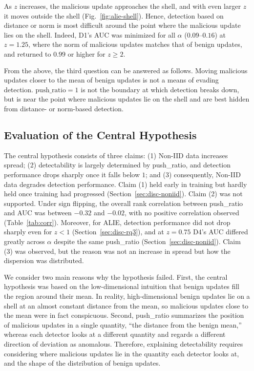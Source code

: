 \documentclass[a4paper,10pt]{article}
\newcommand{\PushRatio}{\textrm{push\_ratio}}
\newcommand{\Spread}{\textrm{spread}}
\begin{document}
As $z$ increases, the malicious update approaches the shell, and with even larger $z$ it moves outside the shell (Fig.~\ref{fig:alie-shell}). Hence, detection based on distance or norm is most difficult around the point where the malicious update lies on the shell. Indeed, D1's AUC was minimized for all $\alpha$ ($0.09$--$0.16$) at $z=1.25$, where the norm of malicious updates matches that of benign updates, and returned to $0.99$ or higher for $z \ge 2$.

From the above, the third question can be answered as follows. Moving malicious updates closer to the mean of benign updates is not a means of evading detection. $\PushRatio=1$ is not the boundary at which detection breaks down, but is near the point where malicious updates lie on the shell and are best hidden from distance- or norm-based detection.

\subsection{Evaluation of the Central Hypothesis}
\label{sec:disc-hyp}

The central hypothesis consists of three claims: (1) Non-IID data increases \Spread{}; (2) detectability is largely determined by \PushRatio{}, and detection performance drops sharply once it falls below $1$; and (3) consequently, Non-IID data degrades detection performance. Claim (1) held early in training but hardly held once training had progressed (Section~\ref{sec:disc-noniid}). Claim (2) was not supported. Under sign flipping, the overall rank correlation between \PushRatio{} and AUC was between $-0.32$ and $-0.02$, with no positive correlation observed (Table~\ref{tab:corr}). Moreover, for ALIE, detection performance did not drop sharply even for $z<1$ (Section~\ref{sec:disc-rq3}), and at $z=0.75$ D4's AUC differed greatly across $\alpha$ despite the same \PushRatio{} (Section~\ref{sec:disc-noniid}). Claim (3) was observed, but the reason was not an increase in \Spread{} but how the dispersion was distributed.

We consider two main reasons why the hypothesis failed. First, the central hypothesis was based on the low-dimensional intuition that benign updates fill the region around their mean. In reality, high-dimensional benign updates lie on a shell at an almost constant distance from the mean, so malicious updates close to the mean were in fact conspicuous. Second, \PushRatio{} summarizes the position of malicious updates in a single quantity, ``the distance from the benign mean,'' whereas each detector looks at a different quantity and regards a different direction of deviation as anomalous. Therefore, explaining detectability requires considering where malicious updates lie in the quantity each detector looks at, and the shape of the distribution of benign updates.
\end{document}
